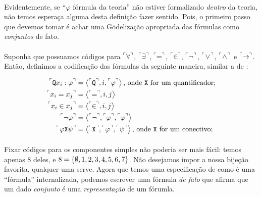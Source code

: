         \paragraph{}
            Evidentemente, se ``$\varphi \text{ fórmula da teoria}$'' não estiver formalizado \textit{dentro} da teoria, não 
            temos esperaça alguma desta definição fazer sentido. Pois, o primeiro passo que devemos tomar é achar uma Gödelização
            apropriada das fórmulas como \textit{conjuntos} de fato. 
        \paragraph{}
            Suponha que possuamos códigos para $\FMLA{\forall}$, $\FMLA{\exists}$, $\FMLA{\!\!=\!\!}$, $\FMLA{\!\!\in\!\!}$, 
            $\FMLA{\neg}$, $\FMLA{\!\lor\!}$, $\FMLA{\!\land\!}$ e $\FMLA{\!\!\rar\!\!}$.
            Então, definimos a codificação das fórmulas da seguinte maneira, similar a de \cite{Drake}:

        \begin{align*}
            \FMLA{\texttt{Q} x_i:\varphi} &= \TUPLE{\FMLA{\texttt{Q}}}{i}{\FMLA{\varphi}}           \text{, onde \texttt{X} for um quantificador;}  \\
            \FMLA{x_i  = x_j}             &= \TUPLE{\FMLA{\!\!=\!\!}}{i}{j}                                                                         \\
            \FMLA{x_i\in x_j}             &= \TUPLE{\FMLA{\!\!\in\!\!}}{i}{j}                                                                       \\
            \FMLA{\neg\varphi}            &= \TUPLE{\FMLA{\neg}}{\FMLA{\varphi}}{\FMLA{\varphi}}                                                    \\
            \FMLA{\varphi\texttt{X}\psi}  &= \TUPLE{\FMLA{\texttt{X}}}{\FMLA{\varphi}}{\FMLA{\psi}} \text{, onde \texttt{X} for um conectivo;}      
        \end{align*}

        \paragraph{}
            Fixar códigos para os componentes simples não poderia ser mais fácil: temos apenas 8 deles, e $8 = \SET{\emptyset}{1}{2}{3}{4}{5}{6}{7}$.
            Não desejamos impor a nossa bijeção favorita, qualquer uma serve. Agora que temos uma especificação de como é uma ``fórmula'' internalizada, 
            podemos escrever uma fórmula \textit{de fato} que afirma que um dado \textit{conjunto} é uma \textit{representação} de um fórumla.
        
